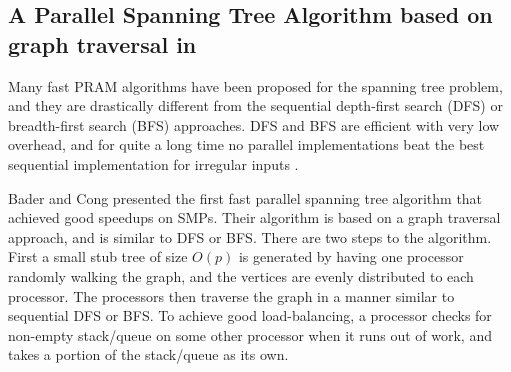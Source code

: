 \subsection{A Parallel Spanning Tree Algorithm based on graph traversal in \Xten{}}
\label{s:trav}

Many fast PRAM algorithms have been proposed for the spanning tree
problem, and they are drastically different from the sequential
depth-first search (DFS) or breadth-first search (BFS) approaches.
DFS and BFS are efficient with very low overhead, and for quite a long
time no parallel implementations beat the best sequential
implementation for irregular inputs \cite{BC04a}.

Bader and Cong \cite{BC04a} presented the first fast parallel spanning
tree algorithm that achieved good speedups on SMPs. Their algorithm is
based on a graph traversal approach, and is similar to DFS or BFS.
There are two steps to the algorithm. First a small stub tree of size
$O(p)$ is generated by having one processor randomly walking the
graph, and the vertices are evenly distributed to each processor.  The
processors then traverse the graph in a manner similar to sequential
DFS or BFS.  To achieve good load-balancing, a processor checks for
non-empty stack/queue on some other processor when it runs out of
work, and takes a portion of the stack/queue as its own.

